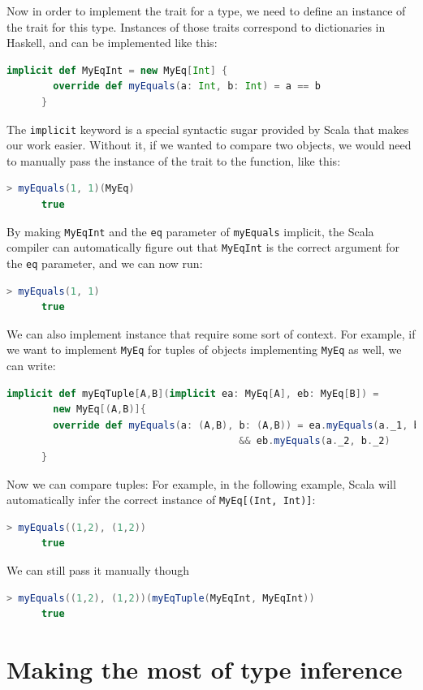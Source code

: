 \documentclass[abstracton,parskip=half]{scrreprt}
\newcommand{\cd}{\texttt}
\begin{document}
    Now in order to implement the trait for a type, we need to define an instance
    of the trait for this type. Instances of those traits correspond to dictionaries
    in Haskell, and can be implemented like this:
    \begin{lstlisting}[language=Scala,gobble=6]
      implicit def MyEqInt = new MyEq[Int] {
        override def myEquals(a: Int, b: Int) = a == b
      }
    \end{lstlisting}
    The \cd{implicit} keyword is a special syntactic sugar provided by Scala
    that makes our work easier. Without it, if we wanted to compare two objects,
    we would need to manually pass the instance of the trait to the function,
    like this:
    \begin{lstlisting}[language=Scala,gobble=6]
      > myEquals(1, 1)(MyEq)
      true
    \end{lstlisting}
    By making \cd{MyEqInt} and the \cd{eq} parameter of \cd{myEquals} implicit,
    the Scala compiler can automatically figure out that \cd{MyEqInt} is the
    correct argument for the \cd{eq} parameter, and we can now run:
    \begin{lstlisting}[language=Scala,gobble=6]
      > myEquals(1, 1)
      true
    \end{lstlisting}


    We can also implement instance that require some sort of context. For
    example, if we want to implement \cd{MyEq} for tuples of objects implementing
    \cd{MyEq} as well, we can write:
    \begin{lstlisting}[language=Scala,gobble=6]
      implicit def myEqTuple[A,B](implicit ea: MyEq[A], eb: MyEq[B]) =
        new MyEq[(A,B)]{
        override def myEquals(a: (A,B), b: (A,B)) = ea.myEquals(a._1, b._1)
                                        && eb.myEquals(a._2, b._2)
      }
    \end{lstlisting}
    Now we can compare tuples: For example, in the following example, Scala will
    automatically infer the correct instance of \cd{MyEq[(Int, Int)]}:
    \begin{lstlisting}[language=Scala,gobble=6]
      > myEquals((1,2), (1,2))
      true
    \end{lstlisting}
    We can still pass  it manually though
    \begin{lstlisting}[language=Scala,gobble=6]
      > myEquals((1,2), (1,2))(myEqTuple(MyEqInt, MyEqInt))
      true
    \end{lstlisting}

    \section{Making the most of type inference}
\end{document}
